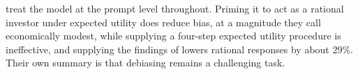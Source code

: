 \label{app:deliberation}
\citet{bini2026behavioral} treat the model at the prompt level throughout.
Priming it to act as a rational investor under expected utility does reduce
bias, at a magnitude they call economically modest, while supplying a
four-step expected utility procedure is ineffective, and supplying the
findings of \citet{kahneman1979prospect} lowers rational responses by about
29\%. Their own summary is that debiasing remains a challenging task.
